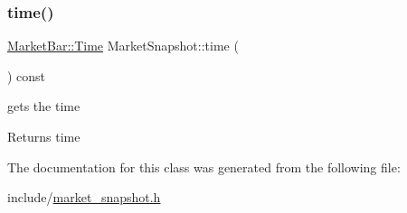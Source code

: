 \subsubsection{\texorpdfstring{time()}{time()}}
{\footnotesize\ttfamily \hyperlink{classMarketBar_a0d7dabe1fd00e674ef72f54bb1ff9ad0}{Market\+Bar\+::\+Time} Market\+Snapshot\+::time (\begin{DoxyParamCaption}{ }\end{DoxyParamCaption}) const}



gets the time 

\begin{DoxyReturn}{Returns}
time 
\end{DoxyReturn}


The documentation for this class was generated from the following file\+:\begin{DoxyCompactItemize}
\item 
include/\hyperlink{market__snapshot_8h}{market\+\_\+snapshot.\+h}\end{DoxyCompactItemize}
